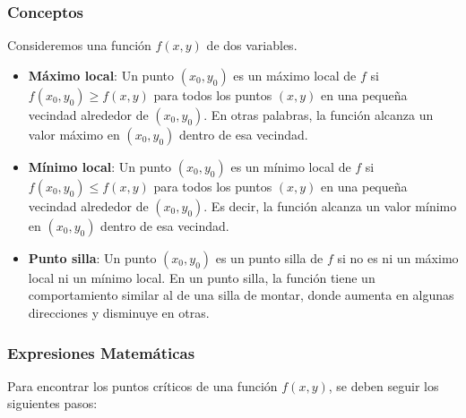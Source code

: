 \subsubsection{Conceptos}

Consideremos una función $f(x,y)$ de dos variables.

\begin{itemize}
	\item \textbf{Máximo local}: Un punto $(x_0, y_0)$ es un máximo local de $f$ si $f(x_0, y_0) \ge f(x, y)$ para todos los puntos $(x, y)$ en una pequeña vecindad alrededor de  $(x_0, y_0)$.  En otras palabras, la función alcanza un valor máximo en $(x_0, y_0)$ dentro de esa vecindad.
	
	\item \textbf{Mínimo local}: Un punto $(x_0, y_0)$ es un mínimo local de $f$ si $f(x_0, y_0) \le f(x, y)$ para todos los puntos $(x, y)$ en una pequeña vecindad alrededor de  $(x_0, y_0)$. Es decir, la función alcanza un valor mínimo en $(x_0, y_0)$ dentro de esa vecindad.
	
	\item \textbf{Punto silla}: Un punto $(x_0, y_0)$ es un punto silla de $f$ si no es ni un máximo local ni un mínimo local. En un punto silla, la función tiene un comportamiento similar al de una silla de montar, donde aumenta en algunas direcciones y disminuye en otras.
\end{itemize}

\subsubsection{Expresiones Matemáticas}

Para encontrar los puntos críticos de una función $f(x,y)$, se deben seguir los siguientes pasos:

